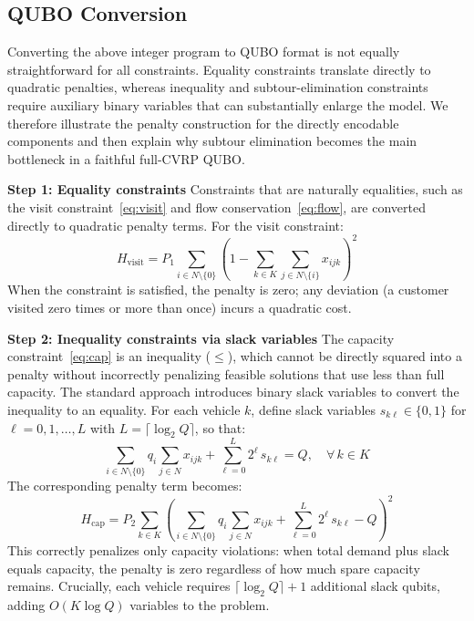 \documentclass[preprint,3p,12pt,authoryear]{elsarticle}
\begin{document}
{\color{red}\subsection{QUBO Conversion}

Converting the above integer program to QUBO format is not equally straightforward for all constraints. Equality constraints translate directly to quadratic penalties, whereas inequality and subtour-elimination constraints require auxiliary binary variables that can substantially enlarge the model. We therefore illustrate the penalty construction for the directly encodable components and then explain why subtour elimination becomes the main bottleneck in a faithful full-CVRP QUBO.

\textbf{Step 1: Equality constraints} Constraints that are naturally equalities, such as the visit constraint~\eqref{eq:visit} and flow conservation~\eqref{eq:flow}, are converted directly to quadratic penalty terms. For the visit constraint:
\begin{equation}
H_{\text{visit}} = P_1 \sum_{i \in N \setminus \{0\}} \left(1 - \sum_{k \in K} \sum_{j \in N \setminus \{i\}} x_{ijk}\right)^2 \label{eq:qubo-visit}
\end{equation}
When the constraint is satisfied, the penalty is zero; any deviation (a customer visited zero times or more than once) incurs a quadratic cost.

\textbf{Step 2: Inequality constraints via slack variables} The capacity constraint~\eqref{eq:cap} is an inequality ($\leq$), which cannot be directly squared into a penalty without incorrectly penalizing feasible solutions that use less than full capacity. The standard approach introduces binary slack variables to convert the inequality to an equality. For each vehicle $k$, define slack variables $s_{k\ell} \in \{0,1\}$ for $\ell = 0, 1, \ldots, L$ with $L = \lceil \log_2 Q \rceil$, so that:
\begin{equation}
\sum_{i \in N \setminus \{0\}} q_i \sum_{j \in N} x_{ijk} + \sum_{\ell=0}^{L} 2^{\ell}\, s_{k\ell} = Q, \quad \forall\, k \in K \label{eq:slack}
\end{equation}
The corresponding penalty term becomes:
\begin{equation}
H_{\text{cap}} = P_2 \sum_{k \in K} \left(\sum_{i \in N \setminus \{0\}} q_i \sum_{j \in N} x_{ijk} + \sum_{\ell=0}^{L} 2^{\ell}\, s_{k\ell} - Q\right)^2 \label{eq:qubo-cap}
\end{equation}
This correctly penalizes only capacity violations: when total demand plus slack equals capacity, the penalty is zero regardless of how much spare capacity remains. Crucially, each vehicle requires $\lceil \log_2 Q \rceil + 1$ additional slack qubits, adding $O(K \log Q)$ variables to the problem.

}
\end{document}
